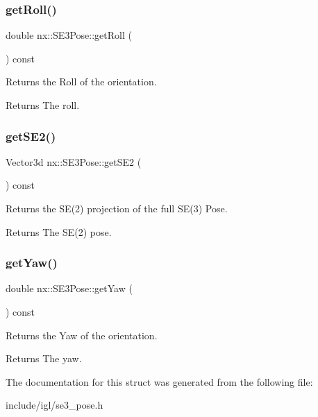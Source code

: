\subsubsection{\texorpdfstring{get\+Roll()}{getRoll()}}
{\footnotesize\ttfamily double nx\+::\+S\+E3\+Pose\+::get\+Roll (\begin{DoxyParamCaption}{ }\end{DoxyParamCaption}) const\hspace{0.3cm}{\ttfamily [inline]}}

Returns the Roll of the orientation. \begin{DoxyReturn}{Returns}
The roll. 
\end{DoxyReturn}
\mbox{\label{structnx_1_1SE3Pose_a1796e8aafcf90da2e6b0d07ca4c7135f}} 
\subsubsection{\texorpdfstring{get\+S\+E2()}{getSE2()}}
{\footnotesize\ttfamily Vector3d nx\+::\+S\+E3\+Pose\+::get\+S\+E2 (\begin{DoxyParamCaption}{ }\end{DoxyParamCaption}) const\hspace{0.3cm}{\ttfamily [inline]}}

Returns the S\+E(2) projection of the full S\+E(3) Pose. \begin{DoxyReturn}{Returns}
The S\+E(2) pose. 
\end{DoxyReturn}
\mbox{\label{structnx_1_1SE3Pose_a103674ebbf5d7e62b9ead5131bbdd289}} 
\subsubsection{\texorpdfstring{get\+Yaw()}{getYaw()}}
{\footnotesize\ttfamily double nx\+::\+S\+E3\+Pose\+::get\+Yaw (\begin{DoxyParamCaption}{ }\end{DoxyParamCaption}) const\hspace{0.3cm}{\ttfamily [inline]}}

Returns the Yaw of the orientation. \begin{DoxyReturn}{Returns}
The yaw. 
\end{DoxyReturn}


The documentation for this struct was generated from the following file\+:\begin{DoxyCompactItemize}
\item 
include/igl/se3\+\_\+pose.\+h\end{DoxyCompactItemize}
